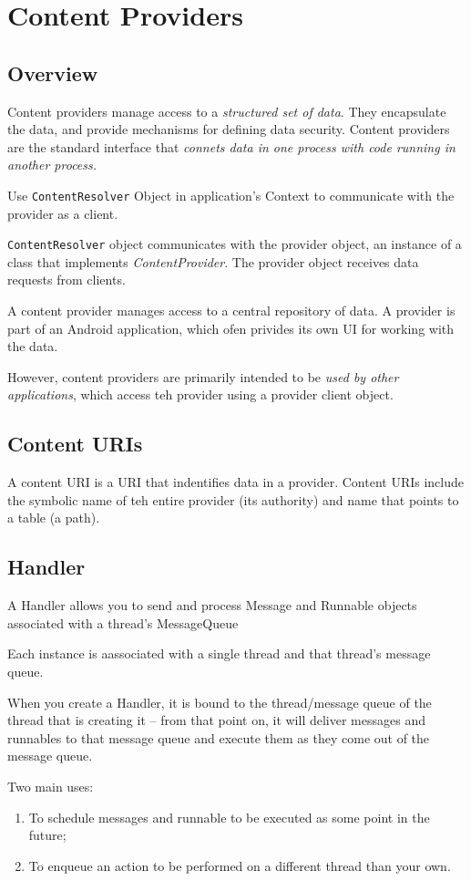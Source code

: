 \documentclass[11pt, a4paper]{book}
\begin{document}
\chapter{Content Providers}
\section{Overview}
Content providers manage access to a \emph{structured set of data}. They
encapsulate the data, and provide mechanisms for defining data security. Content
providers are the standard interface that \emph{connets data in one process with
code running in another process.}

Use \verb|ContentResolver| Object in application's Context to communicate with
the provider as a client. 

\verb|ContentResolver| object communicates with the provider object, an instance
of a class that implements \emph{ContentProvider}. The provider object receives
data requests from clients. 

A content provider manages access to a central repository of data. A provider is
part of an Android application, which ofen privides its own UI for working with
the data. 

However, content providers are primarily intended to be \emph{used by other
applications}, which access teh provider using a provider client object. 

\section{Content URIs}
A content URI is a URI that indentifies data in a provider. Content URIs include
the symbolic name of teh entire provider (its authority) and name that points to
a table (a path).
\section{Handler}
A Handler allows you to send and process Message and Runnable objects associated
with a thread's MessageQueue

Each instance is aassociated with a single thread and that thread's message
queue.

When you create a Handler, it is bound to the thread/message queue of the thread
that is creating it -- from that point on, it will deliver messages and
runnables to that message queue and execute them as they come out of the message
queue. 

Two main uses:
\begin{enumerate}
\item To schedule messages and runnable to be executed as some point in the
future;
\item To enqueue an action to be performed on a different thread than your own.
\end{enumerate}
\end{document}
